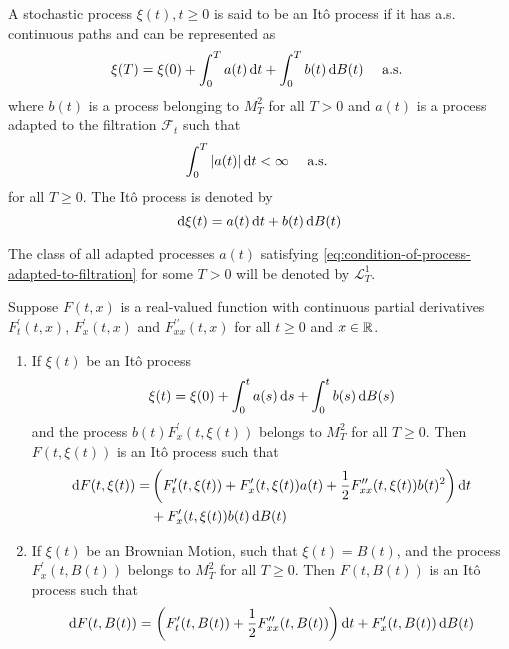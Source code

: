 \begin{definition}
	A stochastic process $\xi(t),t\geq 0$ is said to be an Itô process if it has a.s. continuous paths and can be represented as
	\begin{equation}
		\xi(T)=\xi(0)+\int_{0}^{T}a(t)\mathop{}\!\mathrm{d} t+\int_{0}^{T}b(t)\mathop{}\!\mathrm{d} B(t)\quad\text { a.s. }
	\end{equation}
	where $b(t)$ is a process belonging to $M_{T}^{2}$ for all $T>0$ and $a(t)$ is a process adapted to the filtration $\mathcal{F}_{t}$ such that
	\begin{equation}
		\int_{0}^{T}|a(t)|\mathop{}\!\mathrm{d} t<\infty\quad\text { a.s. } \label{eq:condition-of-process-adapted-to-filtration}
	\end{equation}
	for all $T\geq 0$.
	The Itô process is denoted by
	\begin{equation}
		\mathop{}\!\mathrm{d}\xi(t)=a(t)\mathop{}\!\mathrm{d} t+b(t)\mathop{}\!\mathrm{d} B(t)
	\end{equation}
\end{definition}

\begin{remark}
	The class of all adapted processes $a(t)$ satisfying \ref{eq:condition-of-process-adapted-to-filtration} for some $T>0$ will be denoted by $\mathcal{L}_{T}^{1}$.
\end{remark}

\begin{theorem}[It\^o Formula]
	Suppose $F\left(t,x\right)$ is a real-valued function with continuous partial derivatives $F_{t}^{\prime}\left(t,x\right)$, $F_{x}^{\prime}\left(t,x\right)$ and $F_{xx}^{\prime\prime}\left(t,x\right)$ for all $t\geq 0$ and $x\in{\mathbb R}$.
	\begin{enumerate}
		\item If $\xi(t)$ be an It\^o process
		      \begin{equation*}
			      \xi(t)=\xi(0)+\int_{0}^{t}a(s)\mathop{}\!\mathrm{d} s+\int_{0}^{t}b(s)\mathop{}\!\mathrm{d} B(s)
		      \end{equation*}
		      and the process $b(t)F_{x}^{\prime}(t,\xi(t))$ belongs to $M_{T}^{2}$ for all $T\geq 0$. Then $F(t,\xi(t))$ is an It\^o process such that
		      \begin{equation}
			      \begin{aligned}
				      \mathop{}\!\mathrm{d} F(t,\xi(t))= & \left(F_{t}^{\prime}(t,\xi(t))+F_{x}^{\prime}(t,\xi(t))a(t)+\frac{1}{2}F_{xx}^{\prime\prime}(t,\xi(t))b(t)^{2}\right)\mathop{}\!\mathrm{d} t \\
				                        & +F_{x}^{\prime}(t,\xi(t))b(t)\mathop{}\!\mathrm{d} B(t)
			      \end{aligned}
		      \end{equation}
		\item If $\xi(t)$ be an Brownian Motion, such that $\xi(t)=B(t)$, and the process $F_{x}^{\prime}(t,B(t))$ belongs to $M_{T}^{2}$ for all $T \geq 0$. Then $F(t,B(t))$ is an It\^o process such that
		      \begin{equation}
			      \mathop{}\!\mathrm{d} F(t,B(t))=\left(F_{t}^{\prime}(t,B(t))+\frac{1}{2}F_{xx}^{\prime\prime}(t,B(t))\right)\mathop{}\!\mathrm{d} t+F_{x}^{\prime}(t,B(t))\mathop{}\!\mathrm{d} B(t)
		      \end{equation}
	\end{enumerate}
\end{theorem}

